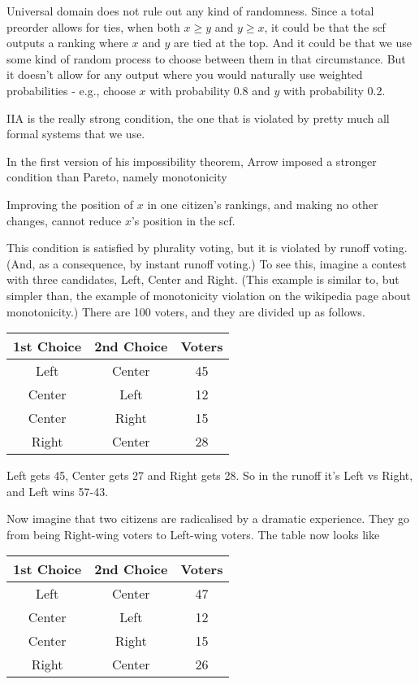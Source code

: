 \documentclass[11pt,]{article}
\providecommand{\tightlist}{%
  \setlength{\itemsep}{0pt}\setlength{\parskip}{0pt}}
\begin{document}
Universal domain does not rule out any kind of randomness. Since a total
preorder allows for ties, when both \(x \geq y\) and \(y \geq x\), it
could be that the scf outputs a ranking where \(x\) and \(y\) are tied
at the top. And it could be that we use some kind of random process to
choose between them in that circumstance. But it doesn't allow for any
output where you would naturally use weighted probabilities - e.g.,
choose \(x\) with probability 0.8 and \(y\) with probability 0.2.

IIA is the really strong condition, the one that is violated by pretty
much all formal systems that we use.

In the first version of his impossibility theorem, Arrow imposed a
stronger condition than Pareto, namely monotonicity

\newpage

\begin{description}
\tightlist
\item[Monotonicity]
Improving the position of \(x\) in one citizen's rankings, and making no
other changes, cannot reduce \(x\)'s position in the scf.
\end{description}

This condition is satisfied by plurality voting, but it is violated by
runoff voting. (And, as a consequence, by instant runoff voting.) To see
this, imagine a contest with three candidates, Left, Center and Right.
(This example is similar to, but simpler than, the example of
monotonicity violation on the wikipedia page about monotonicity.) There
are 100 voters, and they are divided up as follows.

\begin{longtable}[]{@{}ccc@{}}
\toprule
1st Choice & 2nd Choice & Voters\tabularnewline
\midrule
\endhead
Left & Center & 45\tabularnewline
Center & Left & 12\tabularnewline
Center & Right & 15\tabularnewline
Right & Center & 28\tabularnewline
\bottomrule
\end{longtable}

Left gets 45, Center gets 27 and Right gets 28. So in the runoff it's
Left vs Right, and Left wins 57-43.

Now imagine that two citizens are radicalised by a dramatic experience.
They go from being Right-wing voters to Left-wing voters. The table now
looks like

\begin{longtable}[]{@{}ccc@{}}
\toprule
1st Choice & 2nd Choice & Voters\tabularnewline
\midrule
\endhead
Left & Center & 47\tabularnewline
Center & Left & 12\tabularnewline
Center & Right & 15\tabularnewline
Right & Center & 26\tabularnewline
\bottomrule
\end{longtable}
\end{document}
